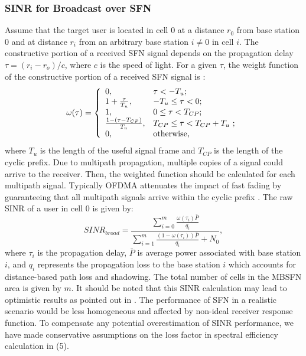 \documentclass[journal]{IEEEtran}
\begin{document}
\subsubsection{\textbf{SINR for Broadcast over SFN}}
Assume that the target user is located in cell $0$ at a distance $r_0$ from base station $0$ and at distance $r_i$ from an arbitrary base station $i\neq0$ in cell $i$. The constructive portion of a received SFN signal depends on the propagation delay $\tau=(r_i-r_o)/c$, where $c$ is the speed of light. For a given $\tau$, the weight function of the constructive portion of a received SFN signal is \cite{Mogensen}\cite{jens}:
\begin{equation}\label{eqn:weight_function}
 \omega(\tau)=\left\{
                \begin{array}{ll}
                    0, & \hbox{$\tau<-T_{u}$;} \\
                  1+\frac{\tau}{T_u}, & \hbox{$-T_{u}\leq\tau<0$;} \\
                   1, & \hbox{$0\leq\tau<T_{CP}$;} \\
                  \frac{1-(\tau-T_{CP})}{T_u}, & \hbox{$T_{CP}\leq\tau<T_{CP}+T_u$ ;} \\
                  0, & \hbox{otherwise,}
                \end{array}
              \right.
\end{equation}
where $T_u$ is the length of the useful signal frame and $T_{CP}$ is the length of the cyclic prefix. Due to multipath propagation, multiple copies of a signal could arrive to the receiver. Then, the weighted function should be calculated for each multipath signal. Typically OFDMA attenuates the impact of fast fading by guaranteeing that all multipath signals arrive within the cyclic prefix \cite{Rong11}. The raw SINR of a user in cell $0$ is given by:
\begin{equation}\label{eqn:SINR_MBSFN}
  SINR_{broad}=\frac{\sum_{i=0}^m\frac{\omega(\tau_i )\bar{P}}{q_i} }{\sum_{i=1}^m\frac{(1-\omega(\tau_i))\bar{P}}{q_i} +N_0},
\end{equation}
where $\tau_i$ is the propagation delay, $\bar{P}$ is average power associated with base station $i$, and $q_i$ represents the propagation loss to the base station $i$ which accounts for distance-based path loss and shadowing. The total number of cells in the MBSFN area is given by $m$.
It should be noted that this SINR calculation may lead to optimistic results as pointed out in \cite{Plets10} \cite{Plets11}. The performance of SFN in a realistic scenario would be less homogeneous and affected by non-ideal receiver response function. To compensate any potential overestimation of SINR performance, we have made conservative assumptions on the loss factor in spectral efficiency calculation in (5).
\end{document}
